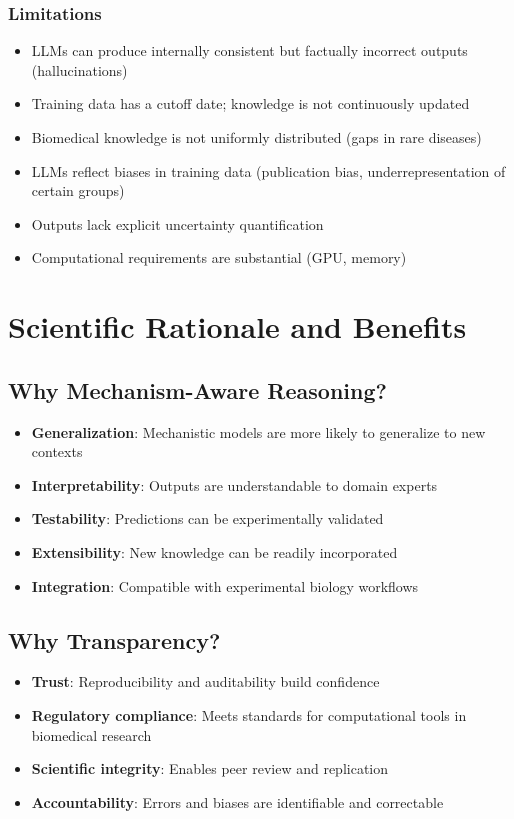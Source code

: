 \documentclass[12pt,a4paper]{article}
\begin{document}
\subsubsection{Limitations}
\begin{itemize}
  \item LLMs can produce internally consistent but factually incorrect outputs (hallucinations)
  \item Training data has a cutoff date; knowledge is not continuously updated
  \item Biomedical knowledge is not uniformly distributed (gaps in rare diseases)
  \item LLMs reflect biases in training data (publication bias, underrepresentation of certain groups)
  \item Outputs lack explicit uncertainty quantification
  \item Computational requirements are substantial (GPU, memory)
\end{itemize}

\section{Scientific Rationale and Benefits}
\label{sec:rationale}

\subsection{Why Mechanism-Aware Reasoning?}
\begin{itemize}
  \item \textbf{Generalization}: Mechanistic models are more likely to generalize to new contexts
  \item \textbf{Interpretability}: Outputs are understandable to domain experts
  \item \textbf{Testability}: Predictions can be experimentally validated
  \item \textbf{Extensibility}: New knowledge can be readily incorporated
  \item \textbf{Integration}: Compatible with experimental biology workflows
\end{itemize}

\subsection{Why Transparency?}
\begin{itemize}
  \item \textbf{Trust}: Reproducibility and auditability build confidence
  \item \textbf{Regulatory compliance}: Meets standards for computational tools in biomedical research
  \item \textbf{Scientific integrity}: Enables peer review and replication
  \item \textbf{Accountability}: Errors and biases are identifiable and correctable
\end{itemize}
\end{document}
